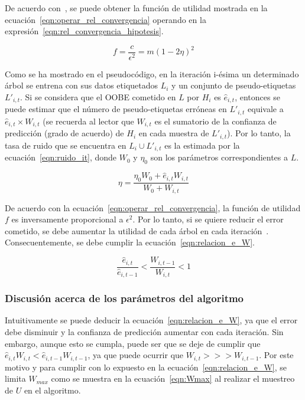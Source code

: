 De acuerdo con~\cite{zhou2021SemisupervisedRecommendationAttack}, se puede obtener la función de utilidad mostrada en la ecuación~\ref{eqn:operar_rel_convergencia} operando en la expresión~\ref{eqn:rel_convergencia_hipotesis}.

\begin{equation}\label{eqn:operar_rel_convergencia} f = \frac{c}{\epsilon^{2}} = m(1-2\eta)^{2} \end{equation} 

Como se ha mostrado en el pseudocódigo, en la iteración i-ésima un determinado árbol se entrena con sus datos etiquetados $L_{i}$ y un conjunto de pseudo-etiquetas $L'_{i,t}$. Si se considera que el OOBE cometido en $L$ por $H_{i}$ es $\hat{e}_{i,t}$, entonces se puede estimar que el número de pseudo-etiquetas erróneas en $L'_{i,t}$ equivale a $\hat{e}_{i,t} \times W_{i,t}$ (se recuerda al lector que $W_{i,t}$ es el sumatorio de la confianza de predicción (grado de acuerdo) de $H_{i}$ en cada muestra de $L'_{i,t}$). Por lo tanto, la tasa de ruido que se encuentra en $L_{i} \cup L'_{i,t}$ es la estimada por la ecuación~\ref{eqn:ruido_it}, donde $W_0$ y $\eta_0$ son los parámetros correspondientes a $L$. 

\begin{equation}\label{eqn:ruido_it} \eta = \frac{\eta_{0}W_{0} + \hat{e}_{i,t}W_{i,t}}{W_{0} + W_{i,t}} \end{equation} 

De acuerdo con la ecuación~\ref{eqn:operar_rel_convergencia}, la función de utilidad $f$ es inversamente proporcional a $\epsilon^2$. Por lo tanto, si se quiere reducir el error cometido, se debe aumentar la utilidad de cada árbol en cada iteración~\cite{zhou2021SemisupervisedRecommendationAttack}. Consecuentemente, se debe cumplir la ecuación~\ref{eqn:relacion_e_W}. 

\begin{equation}\label{eqn:relacion_e_W} \frac{\hat{e}_{i,t}}{\widehat{e}_{i, t-1}} < \frac{W_{i,t-1}}{W_{i,t}} < 1 \end{equation} 


\subsubsection{Discusión acerca de los parámetros del algoritmo}

Intuitivamente se puede deducir la ecuación~\ref{eqn:relacion_e_W}, ya que el error debe disminuir y la confianza de predicción aumentar con cada iteración. Sin embargo, aunque esto se cumpla, puede ser que se deje de cumplir que $\hat{e}_{i,t}W_{i,t} < \hat{e}_{i,t-1}W_{i,t-1}$, ya que puede ocurrir que $ W_{i,t} >>> W_{i,t-1}$. Por este motivo y para cumplir con lo expuesto en la ecuación~\ref{eqn:relacion_e_W}, se limita $W_{max}$ como se muestra en la ecuación~\ref{eqn:Wmax} al realizar el muestreo de $U$ en el algoritmo.

